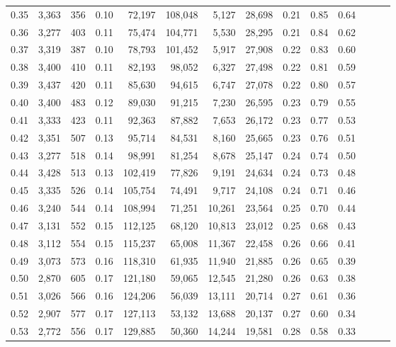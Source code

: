 \begin{tabular}{rrrrrrrrrrrrrr}
0.35 &  3,363 &  356 &  0.10 &   72,197 &  108,048 &   5,127 &  28,698 &  0.21 &  0.85 &      0.64 \\
0.36 &  3,277 &  403 &  0.11 &   75,474 &  104,771 &   5,530 &  28,295 &  0.21 &  0.84 &      0.62 \\
0.37 &  3,319 &  387 &  0.10 &   78,793 &  101,452 &   5,917 &  27,908 &  0.22 &  0.83 &      0.60 \\
0.38 &  3,400 &  410 &  0.11 &   82,193 &   98,052 &   6,327 &  27,498 &  0.22 &  0.81 &      0.59 \\
0.39 &  3,437 &  420 &  0.11 &   85,630 &   94,615 &   6,747 &  27,078 &  0.22 &  0.80 &      0.57 \\
0.40 &  3,400 &  483 &  0.12 &   89,030 &   91,215 &   7,230 &  26,595 &  0.23 &  0.79 &      0.55 \\
0.41 &  3,333 &  423 &  0.11 &   92,363 &   87,882 &   7,653 &  26,172 &  0.23 &  0.77 &      0.53 \\
0.42 &  3,351 &  507 &  0.13 &   95,714 &   84,531 &   8,160 &  25,665 &  0.23 &  0.76 &      0.51 \\
0.43 &  3,277 &  518 &  0.14 &   98,991 &   81,254 &   8,678 &  25,147 &  0.24 &  0.74 &      0.50 \\
0.44 &  3,428 &  513 &  0.13 &  102,419 &   77,826 &   9,191 &  24,634 &  0.24 &  0.73 &      0.48 \\
0.45 &  3,335 &  526 &  0.14 &  105,754 &   74,491 &   9,717 &  24,108 &  0.24 &  0.71 &      0.46 \\
0.46 &  3,240 &  544 &  0.14 &  108,994 &   71,251 &  10,261 &  23,564 &  0.25 &  0.70 &      0.44 \\
0.47 &  3,131 &  552 &  0.15 &  112,125 &   68,120 &  10,813 &  23,012 &  0.25 &  0.68 &      0.43 \\
0.48 &  3,112 &  554 &  0.15 &  115,237 &   65,008 &  11,367 &  22,458 &  0.26 &  0.66 &      0.41 \\
0.49 &  3,073 &  573 &  0.16 &  118,310 &   61,935 &  11,940 &  21,885 &  0.26 &  0.65 &      0.39 \\
0.50 &  2,870 &  605 &  0.17 &  121,180 &   59,065 &  12,545 &  21,280 &  0.26 &  0.63 &      0.38 \\
0.51 &  3,026 &  566 &  0.16 &  124,206 &   56,039 &  13,111 &  20,714 &  0.27 &  0.61 &      0.36 \\
0.52 &  2,907 &  577 &  0.17 &  127,113 &   53,132 &  13,688 &  20,137 &  0.27 &  0.60 &      0.34 \\
0.53 &  2,772 &  556 &  0.17 &  129,885 &   50,360 &  14,244 &  19,581 &  0.28 &  0.58 &      0.33 \\

\end{tabular}
